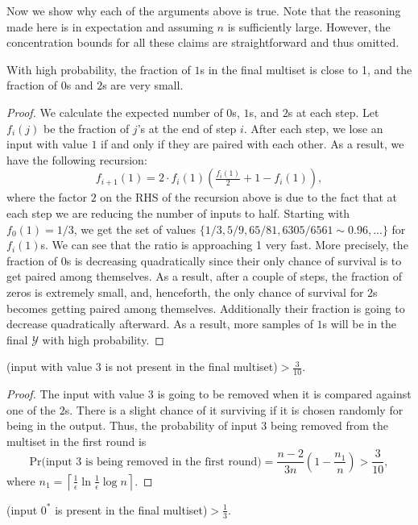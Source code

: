 \documentclass[twoside,11pt]{article}
\newcommand{\cY}{\mathcal{Y}}
\newcommand{\pr}{\text{Pr}}
\newcommand{\errorcomb}{\epsilon}
\begin{document}
\begin{example}
Now we show why each of the arguments above is true. Note that the reasoning made here is in expectation and  assuming $n$ is sufficiently large. However, the concentration bounds for all these claims are straightforward and thus omitted.
\begin{lemma}
\label{lem:1frac}
With high probability, the fraction of $1$s in the final multiset is close to 1, and the fraction of $0$s and $2$s are very small.
\end{lemma}
\begin{proof}
We calculate the expected number of $0$s, $1$s, and $2$s at each step. Let $f_i(j)$ be the fraction of $j$'s at the end of step $i$. After each step, we lose an input with value $1$ if and only if they are paired with each other. As a result, we have the following recursion:
\[
f_{i+1}(1)=2 \cdot f_i(1) \left(\tfrac{f_i(1)}{2}+1-f_i(1)\right),
\]
where the factor $2$ on the RHS of the recursion above is due to the
fact that at each step we are reducing the number of inputs to
half. Starting with $f_0(1)=1/3$, we get the set of values $\{1/3,
5/9, 65/81,6305/6561\sim 0.96, ... \}$ for $f_i(1)$s. We can see that
the ratio is approaching 1 very fast. More precisely, the fraction of
$0$s is decreasing quadratically since their only chance of survival
is to get paired among themselves. As a result, after a couple of
steps, the fraction of zeros is extremely small, and, henceforth, the
only chance of survival for $2$s becomes getting paired among
themselves. Additionally their fraction is going to decrease quadratically
afterward. As a result, more samples of $1$s will be in the final
$\cY$ with high probability.
\end{proof}
\begin{lemma}
\label{lem:rmv3}
\pr(input with value $3$ is not present in the final multiset)$>\frac3{10}.$
\end{lemma}
\begin{proof}
The input with value $3$ is going to be removed when it is compared
against one of the $2$s. There is a slight chance of it surviving 
if it is chosen randomly for being in the output. Thus, the probability
of input $3$ being removed from the multiset in the first round is
\[
\pr\text{(input } 3 \text{ is being removed in the first round)}=\frac{n-2}{3n}\left(1-\frac{n_1}{n}\right) > \frac3{10},
\]
where $n_1 =\left\lceil\frac1\errorcomb\ln \frac1\errorcomb \log n \right\rceil$.
\end{proof}
\begin{lemma}
\label{lem:nrmv0*}
\pr(input $0^*$ is present in the final multiset)$>\frac13.$

\end{lemma}
\end{example}
\end{document}
